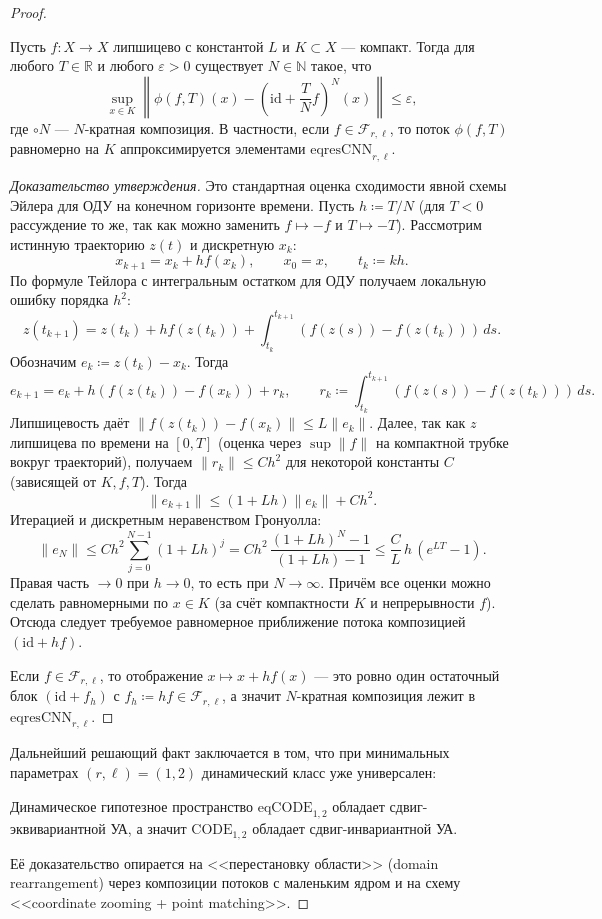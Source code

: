\documentclass[../NDCNNAI_main.tex]{subfiles}
\begin{document}
\begin{proof}
\begin{proposition}
\label{prop:euler_resnet}
Пусть $f:X\to X$ липшицево с константой $L$ и $K\subset X$ --- компакт.
Тогда для любого $T\in\mathbb{R}$ и любого $\varepsilon>0$ существует $N\in\mathbb{N}$ такое, что
\[
\sup_{x\in K}\left\|\phi(f,T)(x)-\left(\mathrm{id}+\frac{T}{N}f\right)^{N}(x)\right\|\le \varepsilon,
\]
где $\circ N$ --- $N$-кратная композиция.
В частности, если $f\in\mathcal{F}_{r,\ell}$, то поток $\phi(f,T)$ равномерно на $K$ аппроксимируется элементами $\mathrm{eqresCNN}_{r,\ell}$.  
\end{proposition}
\begin{proof}[Доказательство утверждения]
Это стандартная оценка сходимости явной схемы Эйлера для ОДУ на конечном горизонте времени.
Пусть $h\coloneq T/N$ (для $T<0$ рассуждение то же, так как можно заменить $f\mapsto -f$ и $T\mapsto -T$).
Рассмотрим истинную траекторию $z(t)$ и дискретную $x_k$:
\[
x_{k+1}=x_k+h f(x_k),\qquad x_0=x,\qquad t_k\coloneq kh.
\]
По формуле Тейлора с интегральным остатком для ОДУ получаем локальную ошибку порядка $h^2$:
\[
z(t_{k+1}) = z(t_k)+h f(z(t_k)) + \int_{t_k}^{t_{k+1}}(f(z(s))-f(z(t_k)))\,ds.
\]
Обозначим $e_k\coloneq z(t_k)-x_k$.
Тогда
\[
e_{k+1}=e_k+h(f(z(t_k))-f(x_k)) + r_k,
\qquad r_k\coloneq \int_{t_k}^{t_{k+1}}(f(z(s))-f(z(t_k)))\,ds.
\]
Липшицевость даёт $\|f(z(t_k))-f(x_k)\|\le L\|e_k\|$.
Далее, так как $z$ липшицева по времени на $[0,T]$ (оценка через $\sup\|f\|$ на компактной трубке вокруг траекторий),
получаем $\|r_k\|\le C h^2$ для некоторой константы $C$ (зависящей от $K,f,T$). Тогда
\[
\|e_{k+1}\|\le (1+Lh)\|e_k\| + Ch^2.
\]
Итерацией и дискретным неравенством Гронуолла:
\[
\|e_N\|\le Ch^2\sum_{j=0}^{N-1}(1+Lh)^j
= Ch^2\,\frac{(1+Lh)^N-1}{(1+Lh)-1}
\le \frac{C}{L}\,h\,(e^{LT}-1).
\]
Правая часть $\to 0$ при $h\to 0$, то есть при $N\to\infty$.
Причём все оценки можно сделать равномерными по $x\in K$ (за счёт компактности $K$ и непрерывности $f$).
Отсюда следует требуемое равномерное приближение потока композицией $(\mathrm{id}+h f)$.

Если $f\in\mathcal{F}_{r,\ell}$, то отображение $x\mapsto x+h f(x)$ --- это ровно один остаточный блок
$(\mathrm{id}+f_h)$ с $f_h\coloneq h f\in\mathcal{F}_{r,\ell}$, а значит $N$-кратная композиция лежит в $\mathrm{eqresCNN}_{r,\ell}$.
\end{proof}

Дальнейший решающий факт заключается в том, что при минимальных параметрах $(r,\ell)=(1,2)$ динамический класс уже универсален:
\begin{theorem}
\label{thm:eqcode_UA}
Динамическое гипотезное пространство $\mathrm{eqCODE}_{1,2}$ обладает сдвиг-эквивариантной УА, а значит $\mathrm{CODE}_{1,2}$ обладает сдвиг-инвариантной УА.  
\end{theorem}
Её доказательство опирается на <<перестановку области>> (domain rearrangement)
через композиции потоков с маленьким ядром и на схему <<coordinate zooming + point matching>>.


\end{proof}
\end{document}
